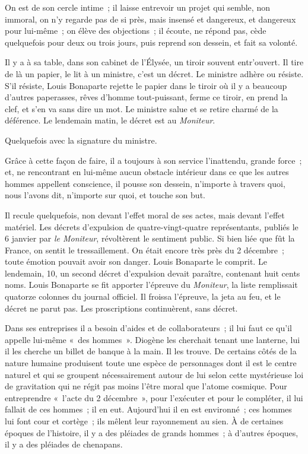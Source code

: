 \documentclass[french,twoside]{book} %
\begin{document}
On est de son cercle intime ; il laisse entrevoir un projet qui semble, non immoral, on n’y regarde pas de si près, mais insensé et dangereux, et dangereux pour lui-même ; on élève des objections ; il écoute, ne répond pas, cède quelquefois pour deux ou trois jours, puis reprend son dessein, et fait sa volonté.\par
Il y a à sa table, dans son cabinet de l’Élysée, un tiroir souvent entr’ouvert. Il tire de là un papier, le lit à un ministre, c’est un décret. Le ministre adhère ou résiste. S’il résiste, Louis Bonaparte rejette le papier dans le tiroir où il y a beaucoup d’autres paperasses, rêves d’homme tout-puissant, ferme ce tiroir, en prend la clef, et s’en va sans dire un mot. Le ministre salue et se retire charmé de la déférence. Le lendemain matin, le décret est au \emph{Moniteur}.\par
Quelquefois avec la signature du ministre.\par
Grâce à cette façon de faire, il a toujours à son service l’inattendu, grande force ; et, ne rencontrant en lui-même aucun obstacle intérieur dans ce que les autres hommes appellent conscience, il pousse son dessein, n’importe à travers quoi, nous l’avons dit, n’importe sur quoi, et touche son but.\par
Il recule quelquefois, non devant l’effet moral de ses actes, mais devant l’effet matériel. Les décrets d’expulsion de quatre-vingt-quatre représentants, publiés le 6 janvier par \emph{le Moniteur}, révoltèrent le sentiment public. Si bien liée que fût la France, on sentit le tressaillement. On était encore très près du 2 décembre ; toute émotion pouvait avoir son danger. Louis Bonaparte le comprit. Le lendemain, 10, un second décret d’expulsion devait paraître, contenant huit cents noms. Louis Bonaparte se fit apporter l’épreuve du \emph{Moniteur}, la liste remplissait quatorze colonnes du journal officiel. Il froissa l’épreuve, la jeta au feu, et le décret ne parut pas. Les proscriptions continuèrent, sans décret.\par
Dans ses entreprises il a besoin d’aides et de collaborateurs ; il lui faut ce qu’il appelle lui-même « des hommes ». Diogène les cherchait tenant une lanterne, lui il les cherche un billet de banque à la main. Il les trouve. De certains côtés de la nature humaine produisent toute une espèce de personnages dont il est le centre naturel et qui se groupent nécessairement autour de lui selon cette mystérieuse loi de gravitation qui ne régit pas moins l’être moral que l’atome cosmique. Pour entreprendre « l’acte du 2 décembre », pour l’exécuter et pour le compléter, il lui fallait de ces hommes ; il en eut. Aujourd’hui il en est environné ; ces hommes lui font cour et cortège ; ils mêlent leur rayonnement au sien. À de certaines époques de l’histoire, il y a des pléiades de grands hommes ; à d’autres époques, il y a des pléiades de chenapans.\par
\end{document}
